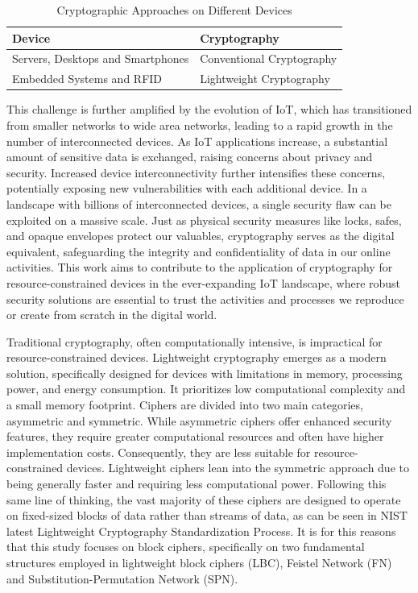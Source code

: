 \documentclass[conference]{IEEEtran}
\begin{document}
\begin{table}[ht]
    \centering
    \caption{Cryptographic Approaches on Different Devices\cite{IoT_1}}
    \begin{tabular}{ll}
        \toprule
        \textbf{Device} & \textbf{Cryptography} \\
        \midrule
        Servers, Desktops and Smartphones & Conventional Cryptography \\
        Embedded Systems and RFID & Lightweight Cryptography \\
        \bottomrule
    \end{tabular}
    \label{table:crypto_devices}
\end{table}

This challenge is further amplified by the evolution of IoT, which has transitioned from smaller networks to wide area networks, leading to a rapid growth in the number of interconnected devices. As IoT applications increase, a substantial amount of sensitive data is exchanged, raising concerns about privacy and security. Increased device interconnectivity further intensifies these concerns, potentially exposing new vulnerabilities with each additional device. In a landscape with billions of interconnected devices, a single security flaw can be exploited on a massive scale.
Just as physical security measures like locks, safes, and opaque envelopes protect our valuables, cryptography serves as the digital equivalent, safeguarding the integrity and confidentiality of data in our online activities. This work aims to contribute to the application of cryptography for resource-constrained devices in the ever-expanding IoT landscape, where robust security solutions are essential to trust the activities and processes we reproduce or create from scratch in the digital world. 

Traditional cryptography, often computationally intensive, is impractical for resource-constrained devices. Lightweight cryptography emerges as a modern solution, specifically designed for devices with limitations in memory, processing power, and energy consumption. It prioritizes low computational complexity and a small memory footprint\cite{zhong2024lightweight}. Ciphers are divided into two main categories, asymmetric and symmetric. While asymmetric ciphers offer enhanced security features, they require greater computational resources and often have higher implementation costs. Consequently, they are less suitable for resource-constrained devices. Lightweight ciphers lean into the symmetric approach due to being generally faster and requiring less computational power. Following this same line of thinking, the vast majority of these ciphers are designed to operate on fixed-sized blocks of data rather than streams of data, as can be seen in NIST latest Lightweight Cryptography Standardization Process\cite{NIST}. It is for this reasons that this study focuses on block ciphers, specifically on two fundamental structures employed in lightweight block ciphers (LBC), Feistel Network (FN) and Substitution-Permutation Network (SPN).
\end{document}
